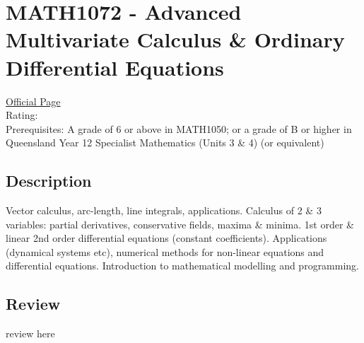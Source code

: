 \hypertarget{MATH1072}{\section{MATH1072 - Advanced Multivariate Calculus \& Ordinary Differential Equations}}

\large
\textcolor{turbo_purple}{\href{https://my.uq.edu.au/programs-courses/course.html?course_code=MATH1072}{Official Page}} \\
Rating: \cstar\cstar\cstar\cstar\ostar \\
Prerequisites: A grade of 6 or above in MATH1050; or a grade of B or higher in Queensland Year 12 Specialist Mathematics (Units 3 \& 4) (or equivalent)

\normalsize
\subsection*{Description}
Vector calculus, arc-length, line integrals, applications.
Calculus of 2 \& 3 variables: partial derivatives, conservative fields, maxima \& minima.
1st order \& linear 2nd order differential equations (constant coefficients).
Applications (dynamical systems etc), numerical methods for non-linear equations and differential equations.
Introduction to mathematical modelling and programming.

\subsection*{Review}
review here
